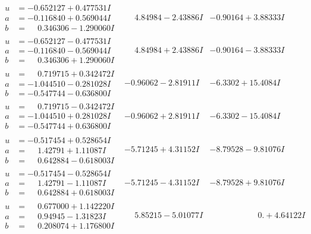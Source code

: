 \documentclass[1p]{elsarticle_modified}
\theoremstyle{definition}
\begin{document}
$$\begin{array}{c|c|c}
\begin{aligned}
u &= -0.652127 + 0.477531 I \\
a &= -0.116840 + 0.569044 I \\
b &= \phantom{-}0.346306 - 1.290060 I\end{aligned}
 & \phantom{-}4.84984 - 2.43886 I & -0.90164 + 3.88333 I \\ \hline\begin{aligned}
u &= -0.652127 - 0.477531 I \\
a &= -0.116840 - 0.569044 I \\
b &= \phantom{-}0.346306 + 1.290060 I\end{aligned}
 & \phantom{-}4.84984 + 2.43886 I & -0.90164 - 3.88333 I \\ \hline\begin{aligned}
u &= \phantom{-}0.719715 + 0.342472 I \\
a &= -1.044510 - 0.281028 I \\
b &= -0.547744 - 0.636800 I\end{aligned}
 & -0.96062 - 2.81911 I & -6.3302 + 15.4084 I \\ \hline\begin{aligned}
u &= \phantom{-}0.719715 - 0.342472 I \\
a &= -1.044510 + 0.281028 I \\
b &= -0.547744 + 0.636800 I\end{aligned}
 & -0.96062 + 2.81911 I & -6.3302 - 15.4084 I \\ \hline\begin{aligned}
u &= -0.517454 + 0.528654 I \\
a &= \phantom{-}1.42791 + 1.11087 I \\
b &= \phantom{-}0.642884 - 0.618003 I\end{aligned}
 & -5.71245 + 4.31152 I & -8.79528 - 9.81076 I \\ \hline\begin{aligned}
u &= -0.517454 - 0.528654 I \\
a &= \phantom{-}1.42791 - 1.11087 I \\
b &= \phantom{-}0.642884 + 0.618003 I\end{aligned}
 & -5.71245 - 4.31152 I & -8.79528 + 9.81076 I \\ \hline\begin{aligned}
u &= \phantom{-}0.677000 + 1.142220 I \\
a &= \phantom{-}0.94945 - 1.31823 I \\
b &= \phantom{-}0.208074 + 1.176800 I\end{aligned}
 & \phantom{-}5.85215 - 5.01077 I & \phantom{-0.000000 -}0. + 4.64122 I \\ \hline\begin{aligned}

\end{aligned}
\end{array}$$
\end{document}
